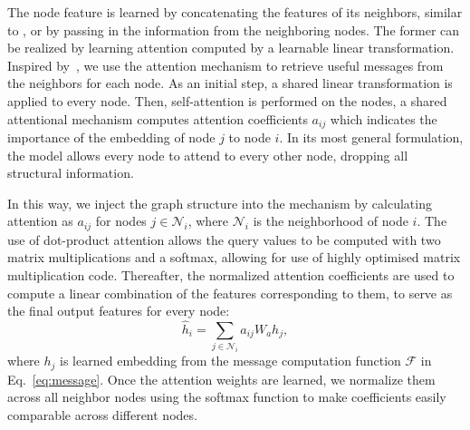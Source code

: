 \documentclass[sigconf]{acmart} %
\newcommand{\eg}{\textit{e.g.}}
\begin{document}
The node feature is learned by concatenating the features of its neighbors, similar to \cite{hamilton2017inductive}, or by passing in the information from the neighboring nodes. The former can be realized by learning attention computed by a learnable linear transformation. Inspired by~\cite{velivckovic2017graph}, we use the attention mechanism to retrieve useful messages from the neighbors for each node. As an initial step, a shared linear transformation is applied to every node. Then, self-attention is performed on the nodes, a shared attentional mechanism computes attention coefficients $a_{ij}$ %
which indicates the importance of the embedding of node $j$ to node $i$. In its most general formulation, the model allows every node to attend to every other node, dropping all structural information. 

In this way, we inject the graph structure into the mechanism by calculating attention as $a_{ij}$ for nodes $j\in\mathcal{N}_i$, where $\mathcal{N}_i$ is the neighborhood of node $i$. 
The use of dot-product attention allows the query values to be computed with two matrix multiplications and a softmax, allowing for use of highly optimised matrix multiplication code. 
Thereafter, the normalized attention coefficients are used to compute a linear combination of the features corresponding to them, to serve as the final output features for every node:
\begin{equation}\label{eqnatt}
	\hat{h}_i = \sum_{j\in\mathcal{N}_i} a_{ij} W_a h_j,
\end{equation}
where $h_j$ is learned embedding from the message computation function $\mathcal{F}$ in Eq.~\ref{eq:message}.
Once the attention weights are learned, we normalize them across all neighbor nodes using the softmax function to make coefficients easily comparable across different nodes.
\end{document}
